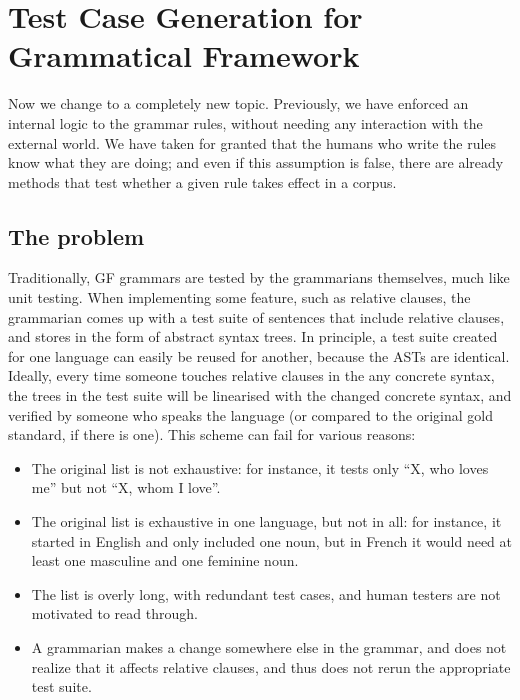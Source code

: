 \def\t#1{\texttt{#1}}


\chapter{Test Case Generation for Grammatical Framework}
\label{chapterGFtest}

Now we change to a completely new topic. 
Previously, we have enforced an internal logic to the grammar rules, without needing any interaction with the external world. We have taken for granted that the humans who write the rules know what they are doing; and even if this assumption is false, there are already methods that test whether a given rule takes effect in a corpus.


\section{The problem}

Traditionally, GF grammars are tested by the grammarians themselves,
much like unit testing. When implementing some feature, such as 
relative clauses, the grammarian comes up with a test suite of 
sentences that include relative clauses, and stores in the form of 
abstract syntax trees. In principle, a test suite created for one 
language can easily be reused for another, because the ASTs are 
identical. Ideally, every time someone touches relative clauses 
in the any concrete syntax, the trees in the test suite will be 
linearised with the changed concrete syntax, and verified by someone
who speaks the language (or compared to the original gold standard, 
if there is one). This scheme can fail for various reasons: 

\begin{itemize}
\item The original list is not exhaustive: for instance, it tests only
``X, who loves me'' but not ``X, whom I love''. 
\item The original list is exhaustive in one language, but not in all:
for instance, it started in English and only included one noun, but in
French it would need at least one masculine and one feminine noun. 
\item The list is overly long, with redundant test cases, and human
testers are not motivated to read through. 
\item A grammarian makes a change somewhere else in the grammar, and
does not realize that it affects relative clauses, and thus does not
rerun the appropriate test suite. 
\end{itemize}

